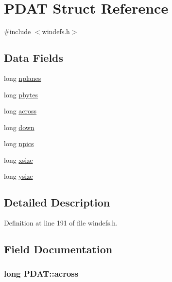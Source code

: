 \hypertarget{structPDAT}{\section{P\+D\+A\+T Struct Reference}
\label{structPDAT}
}


{\ttfamily \#include $<$windefs.\+h$>$}

\subsection*{Data Fields}
\begin{DoxyCompactItemize}
\item 
long \hyperlink{structPDAT_a65023668c3da18118ec0f30379454fa0}{nplanes}
\item 
long \hyperlink{structPDAT_ad37e390e86892790b8784ce46a0e49bd}{pbytes}
\item 
long \hyperlink{structPDAT_a484ed7435d180061a826001556fae6cf}{across}
\item 
long \hyperlink{structPDAT_ad6718ab3ccd6376e55ed5cc672494a7e}{down}
\item 
long \hyperlink{structPDAT_a31146df1ae9c5d9117c669cd516b41ed}{npics}
\item 
long \hyperlink{structPDAT_a957fade03cbfb4ce4de9df4e09be7fc7}{xsize}
\item 
long \hyperlink{structPDAT_ad7ef994c367e747b85e09149fdccff1b}{ysize}
\end{DoxyCompactItemize}


\subsection{Detailed Description}


Definition at line 191 of file windefs.\+h.



\subsection{Field Documentation}
\hypertarget{structPDAT_a484ed7435d180061a826001556fae6cf}{
\subsubsection[{across}]{\setlength{\rightskip}{0pt plus 5cm}long P\+D\+A\+T\+::across}}\label{structPDAT_a484ed7435d180061a826001556fae6cf}


